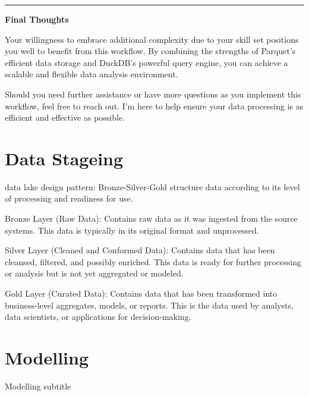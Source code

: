 \documentclass[
  american,
  10,
  a4paper,
]{book}
\theoremstyle{definition}
\theoremstyle{remark}
\begin{document}
\begin{center}\rule{0.5\linewidth}{0.5pt}\end{center}

\textbf{Final Thoughts}

Your willingness to embrace additional complexity due to your skill set
positions you well to benefit from this workflow. By combining the
strengths of Parquet's efficient data storage and DuckDB's powerful
query engine, you can achieve a scalable and flexible data analysis
environment.

Should you need further assistance or have more questions as you
implement this workflow, feel free to reach out. I'm here to help ensure
your data processing is as efficient and effective as possible.

\chapter{Data Stageing}\label{data-stageing-1}

data lake design pattern: Bronze-Silver-Gold structure data according to
its level of processing and readiness for use.

Bronze Layer (Raw Data): Contains raw data as it was ingested from the
source systems. This data is typically in its original format and
unprocessed.

Silver Layer (Cleaned and Conformed Data): Contains data that has been
cleansed, filtered, and possibly enriched. This data is ready for
further processing or analysis but is not yet aggregated or modeled.

Gold Layer (Curated Data): Contains data that has been transformed into
business-level aggregates, models, or reports. This is the data used by
analysts, data scientists, or applications for decision-making.

\chapter{Modelling}\label{modelling}

Modelling subtitle

\hfill\break
\end{document}
